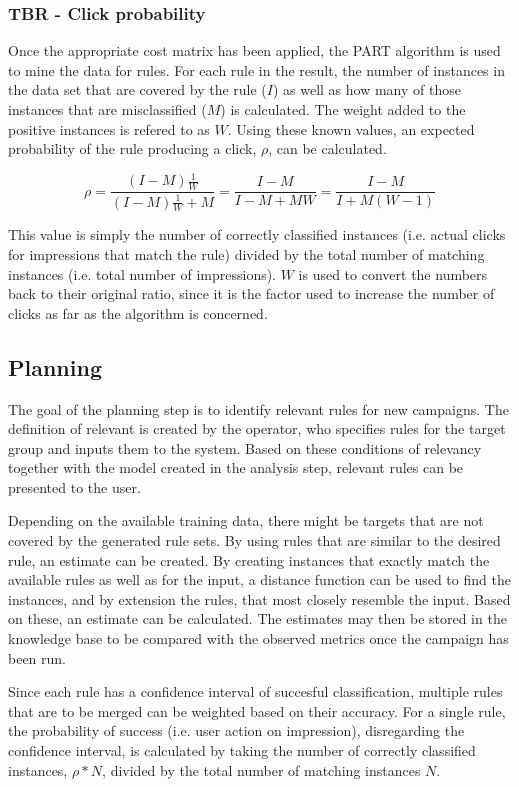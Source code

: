 \documentclass[a4paper]{article}
\begin{document}
\subsubsection{TBR - Click probability}
Once the appropriate cost matrix has been applied, the PART algorithm \citep{Frank1998} is used to mine the data for rules. For each rule in the result, the number of instances in the data set that are covered by the rule (\(I\)) as well as how many of those instances that are misclassified (\(M\)) is calculated. The weight added to the positive instances is refered to as \(W\). Using these known values, an expected probability of the rule producing a click, \(\rho\), can be calculated.

\[
	\rho = \frac{(I-M)\frac{1}{W}}{(I-M)\frac{1}{W}+M} = \frac{I-M}{I-M+MW} = \frac{I-M}{I+M(W-1)}
\]

This value is simply the number of correctly classified instances (i.e. actual clicks for impressions that match the rule) divided by the total number of matching instances (i.e. total number of impressions). \(W\) is used to convert the numbers back to their original ratio, since it is the factor used to increase the number of clicks as far as the algorithm is concerned.

\subsection{Planning}
The goal of the planning step is to identify relevant rules for new campaigns. The definition of relevant is created by the operator, who specifies rules for the target group and inputs them to the system. Based on these conditions of relevancy together with the model created in the analysis step, relevant rules can be presented to the user.

Depending on the available training data, there might be targets that are not covered by the generated rule sets. By using rules that are similar to the desired rule, an estimate can be created. By creating instances that exactly match the available rules as well as for the input, a distance function can be used to find the instances, and by extension the rules, that most closely  resemble the input. Based on these, an estimate can be calculated. The estimates may then be stored in the knowledge base to be compared with the observed metrics once the campaign has been run.

Since each rule has a confidence interval of succesful classification, multiple rules that are to be merged can be weighted based on their accuracy. For a single rule, the probability of success (i.e. user action on impression), disregarding the confidence interval, is calculated by taking the number of correctly classified instances, \(\rho*N\), divided by the total number of matching instances \(N\).
\end{document}
